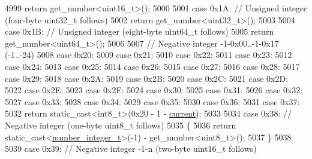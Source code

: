 \begin{DoxyCode}
4999                 \textcolor{keywordflow}{return} get\_number<uint16\_t>();
5000 
5001             \textcolor{keywordflow}{case} 0x1A: \textcolor{comment}{// Unsigned integer (four-byte uint32\_t follows)}
5002                 \textcolor{keywordflow}{return} get\_number<uint32\_t>();
5003 
5004             \textcolor{keywordflow}{case} 0x1B: \textcolor{comment}{// Unsigned integer (eight-byte uint64\_t follows)}
5005                 \textcolor{keywordflow}{return} get\_number<uint64\_t>();
5006 
5007             \textcolor{comment}{// Negative integer -1-0x00..-1-0x17 (-1..-24)}
5008             \textcolor{keywordflow}{case} 0x20:
5009             \textcolor{keywordflow}{case} 0x21:
5010             \textcolor{keywordflow}{case} 0x22:
5011             \textcolor{keywordflow}{case} 0x23:
5012             \textcolor{keywordflow}{case} 0x24:
5013             \textcolor{keywordflow}{case} 0x25:
5014             \textcolor{keywordflow}{case} 0x26:
5015             \textcolor{keywordflow}{case} 0x27:
5016             \textcolor{keywordflow}{case} 0x28:
5017             \textcolor{keywordflow}{case} 0x29:
5018             \textcolor{keywordflow}{case} 0x2A:
5019             \textcolor{keywordflow}{case} 0x2B:
5020             \textcolor{keywordflow}{case} 0x2C:
5021             \textcolor{keywordflow}{case} 0x2D:
5022             \textcolor{keywordflow}{case} 0x2E:
5023             \textcolor{keywordflow}{case} 0x2F:
5024             \textcolor{keywordflow}{case} 0x30:
5025             \textcolor{keywordflow}{case} 0x31:
5026             \textcolor{keywordflow}{case} 0x32:
5027             \textcolor{keywordflow}{case} 0x33:
5028             \textcolor{keywordflow}{case} 0x34:
5029             \textcolor{keywordflow}{case} 0x35:
5030             \textcolor{keywordflow}{case} 0x36:
5031             \textcolor{keywordflow}{case} 0x37:
5032                 \textcolor{keywordflow}{return} \textcolor{keyword}{static\_cast<}int8\_t\textcolor{keyword}{>}(0x20 - 1 - \hyperlink{classnlohmann_1_1detail_1_1binary__reader_a7e994e201b215cd6d6ae28a1853f43e0}{current});
5033 
5034             \textcolor{keywordflow}{case} 0x38: \textcolor{comment}{// Negative integer (one-byte uint8\_t follows)}
5035             \{
5036                 \textcolor{keywordflow}{return} \textcolor{keyword}{static\_cast<}\hyperlink{classnlohmann_1_1detail_1_1binary__reader_ac6065302a10df2e78ed23a0e02e832bf}{number\_integer\_t}\textcolor{keyword}{>}(-1) - get\_number<uint8\_t>();
5037             \}
5038 
5039             \textcolor{keywordflow}{case} 0x39: \textcolor{comment}{// Negative integer -1-n (two-byte uint16\_t follows)}

\end{DoxyCode}
